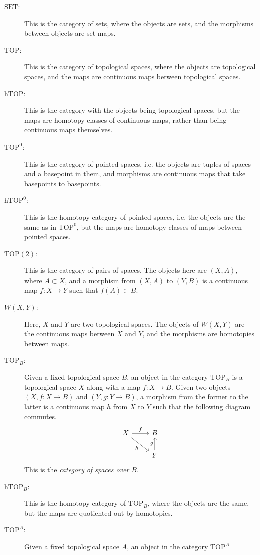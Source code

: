 \documentclass[12pt, notitlepage]{article}
\theoremstyle{definition}
\newcommand{\cat}[1]{\mathrm{#1}}
\begin{document}
\begin{description}
\item[$\cat{SET}$:] This is the category of sets, where the objects are sets, and the morphisms
  between objects are set maps.
\item[$\cat{TOP}$:] This is the category of topological spaces, where the objects are topological
  spaces, and the maps are continuous maps between topological spaces.
\item[$\cat{hTOP}$:] This is the category with the objects being topological spaces, but the maps
  are homotopy classes of continuous maps, rather than being continuous maps themselves.
\item[$\cat{TOP^0}$:] This is the category of pointed spaces, i.e. the objects are tuples of spaces
  and a basepoint in them, and morphisms are continuous maps that take basepoints to basepoints.
\item[$\cat{hTOP^0}$:] This is the homotopy category of pointed spaces, i.e.  the objects are the
  same as in $\cat{TOP^0}$, but the maps are homotopy classes of maps between pointed spaces.
\item[$\cat{TOP(2)}$:] This is the category of pairs of spaces. The objects here are $(X,A)$, where
  $A \subset X$, and a morphism from $(X, A)$ to $(Y, B)$ is a continuous map $f: X \to Y$ such that
  $f(A) \subset B$.
\item[$W(X,Y)$:] Here, $X$ and $Y$ are two topological spaces. The objects of $W(X,Y)$ are the
  continuous maps between $X$ and $Y$, and the morphisms are homotopies between maps.
\item[$\cat{TOP}_B$:] Given a fixed topological space $B$, an object in the category $\cat{TOP}_B$
  is a topological space $X$ along with a map $f: X \to B$.  Given two objects $(X, f : X \to B)$
  and $(Y, g : Y \to B)$, a morphism from the former to the latter is a continuous map $h$ from $X$
  to $Y$ such that the following diagram commutes.
  \[
    \begin{tikzcd}
      X \arrow{r}{f} \arrow[swap]{dr}{h} & B  \\
      & Y \arrow{u}{g}
    \end{tikzcd}
  \]
  This is the \emph{category of spaces over $B$}.
\item[$\cat{hTOP}_B$:] This is the homotopy category of $\cat{TOP}_B$, where the objects are the
  same, but the maps are quotiented out by homotopies.
\item[$\cat{TOP}^A$:] Given a fixed topological space $A$, an object in the category $\cat{TOP}^A$

\end{description}
\end{document}
